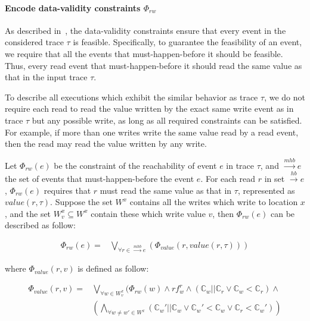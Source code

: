 \documentclass[preprint, numbers, 10pt]{sigplanconf}
\begin{document}
\paragraph{Encode data-validity constraints $\Phi_{rw}$}

As described in~\cite{Huang:2015}, the data-validity constraints
ensure that every event in the considered trace $\tau$ is feasible. 
Specifically, to guarantee the feasibility of an event, we require that
all the events that must-happen-before it should be feasible. Thus,
every read event that must-happen-before it should read the same value
as that in the input trace $\tau$.  

To describe all executions which exhibit the similar behavior as trace $\tau$, 
we do not require each read to read the value written by the exact same write event
as in trace $\tau$ but any possible write, as long as all required constraints
can be satisfied. For example, if more than one writes write the same value read
by a read event, then the read may read the value written by any write.  

Let $\Phi_{rw}(e)$ be the constraint of the reachability of event $e$ in trace $\tau$,
and  $\stackrel{mhb}{\longrightarrow} e$ the set of events that must-happen-before
the event $e$. For each read $r$ in set  $\stackrel{hb}{\longrightarrow} e$, $\Phi_{rw}(e)$
requires that $r$ must read the same value as that in $\tau$, represented as $value(r, \tau)$. 
Suppose the set $W^x$ contains all the writes which write to location $x$, 
and the set $W_v^x\subseteq W^x$ contain these which write value $v$, then
$\Phi_{rw}(e)$ can be described as follow: 

\begin{equation}
\begin{aligned}
\Phi_{rw}(e) ={} & \bigvee_{\forall r\in \stackrel{mhb}{\longrightarrow} e} 
					(\Phi_{value}(r,value(r,\tau)))
\end{aligned}
\end{equation} 

where $\Phi_{value}(r,v)$ is defined as follow: 

\begin{equation}
\begin{aligned}
\Phi_{value}(r,v) ={} & \bigvee_{\forall w\in W_v^x} (\Phi_{rw}(w)\wedge rf^r_w\wedge 
					  (\mathbb{C}_w||\mathbb{C}_r\vee \mathbb{C}_w<\mathbb{C}_r)\wedge \\
					& (\bigwedge_{\forall w\neq w'\in W^x}(\mathbb{C}_w' ||\mathbb{C}_w \vee 
					\mathbb{C}_w'<\mathbb{C}_w \vee \mathbb{C}_r<\mathbb{C}_w'))
\end{aligned}
\end{equation}
\end{document}
